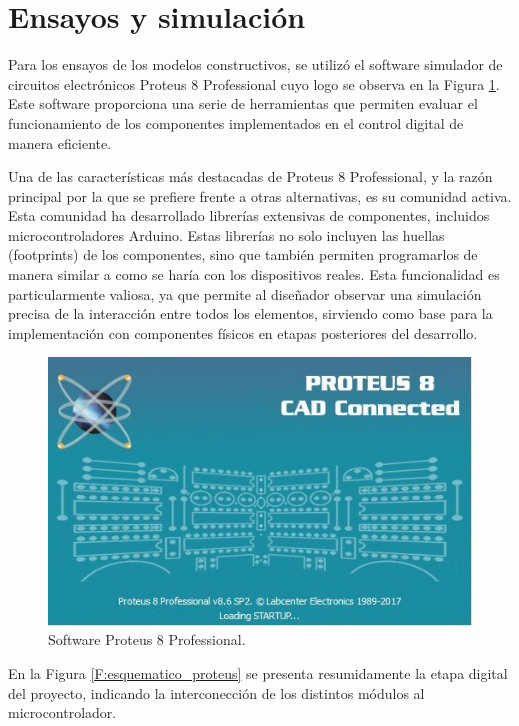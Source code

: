 \section{Ensayos y simulación}
Para los ensayos de los modelos constructivos, se utilizó el software simulador de circuitos electrónicos Proteus 8 Professional cuyo logo se observa en la Figura \ref{F:proteus_logo}. Este software proporciona una serie de herramientas que permiten evaluar el funcionamiento de los componentes implementados en el control digital de manera eficiente. \par 
Una de las características más destacadas de Proteus 8 Professional, y la razón principal por la que se prefiere frente a otras alternativas, es su comunidad activa. Esta comunidad ha desarrollado librerías extensivas de componentes, incluidos microcontroladores Arduino. Estas librerías no solo incluyen las huellas (footprints) de los componentes, sino que también permiten programarlos de manera similar a como se haría con los dispositivos reales. Esta funcionalidad es particularmente valiosa, ya que permite al diseñador observar una simulación precisa de la interacción entre todos los elementos, sirviendo como base para la implementación con componentes físicos en etapas posteriores del desarrollo.
\begin{figure}[H]
    \centering
    \includegraphics[scale=0.4]{./imagenes/proteus_logo.jpg}
    \caption{Software Proteus 8 Professional.}
    \label{F:proteus_logo}
\end{figure}\par 
En la Figura \ref{F:esquematico_proteus} se presenta resumidamente la etapa digital del proyecto, indicando la interconección de los distintos módulos al microcontrolador.
